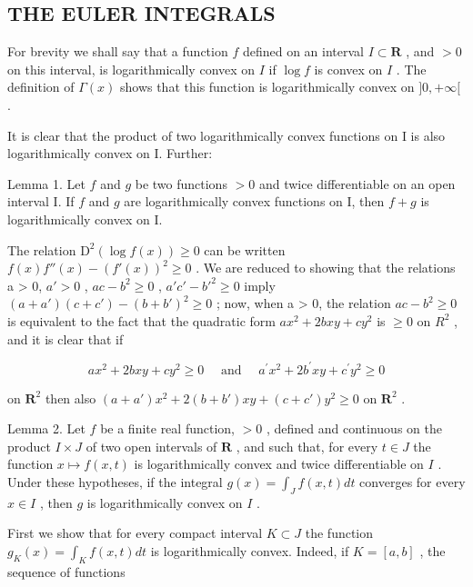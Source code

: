 \subsection{THE EULER INTEGRALS}

For brevity we shall say that a function \(f\) defined on an interval \(I \subset \mathbf{R}\) , and \(> 0\) on this interval, is logarithmically convex on \(I\) if \(\log f\) is convex on \(I\) . The definition of \(\Gamma(x)\) shows that this function is logarithmically convex on \(]0, +\infty[\) .

It is clear that the product of two logarithmically convex functions on I is also logarithmically convex on I. Further:

Lemma 1. Let \(f\) and \(g\) be two functions \(> 0\) and twice differentiable on an open interval I. If \(f\) and \(g\) are logarithmically convex functions on I, then \(f + g\) is logarithmically convex on I.

The relation \(\mathrm{D}^{2}\left(\log f(x)\right) \geqslant 0\) can be written \(f(x)f''(x) - \left(f'(x)\right)^{2} \geqslant 0\) . We are reduced to showing that the relations a \textgreater{} 0, \(a' > 0\) , \(ac - b^{2} \geqslant 0\) , \(a'c' - b'^{2} \geqslant 0\) imply \((a + a')(c + c') - (b + b')^{2} \geqslant 0\) ; now, when a \textgreater{} 0, the relation \(ac - b^{2} \geqslant 0\) is equivalent to the fact that the quadratic form \(ax^{2} + 2bxy + cy^{2}\) is \(\geqslant 0\) on \(R^{2}\) , and it is clear that if

\[
a x ^ {2} + 2 b x y + c y ^ {2} \geqslant 0 \quad \text { and } \quad a ^ {\prime} x ^ {2} + 2 b ^ {\prime} x y + c ^ {\prime} y ^ {2} \geqslant 0
\]

on \(\mathbf{R}^{2}\) then also \((a + a')x^{2} + 2(b + b')xy + (c + c')y^{2} \geqslant 0\) on \(\mathbf{R}^{2}\) .

Lemma 2. Let \(f\) be a finite real function, \(>0\) , defined and continuous on the product \(I \times J\) of two open intervals of \(\mathbf{R}\) , and such that, for every \(t \in J\) the function \(x \mapsto f(x,t)\) is logarithmically convex and twice differentiable on \(I\) . Under these hypotheses, if the integral \(g(x) = \int_{J} f(x,t) dt\) converges for every \(x \in I\) , then \(g\) is logarithmically convex on \(I\) .

First we show that for every compact interval \(K \subset J\) the function \(g_{K}(x) = \int_{K} f(x, t) dt\) is logarithmically convex. Indeed, if \(K = [a, b]\) , the sequence of functions

